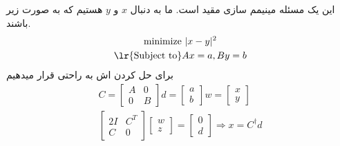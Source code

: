 \documentclass[a4paper]{article}
\begin{document}
\subsection{}
این یک مسئله مینیمم سازی مقید است. ما به دنبال $ x $ و $ y $ هستیم که به صورت زیر باشند. 
\begin{gather*}
	\text{minimize } |x-y|^2 \\
	\text{\lr{Subject to}} Ax = a, By = b\\
\end{gather*}
برای حل کردن اش به راحتی قرار میدهیم 
\begin{gather*}
	C = \begin{bmatrix}
		A & 0 \\
		0 & B
	\end{bmatrix}
	d = \begin{bmatrix}
		a \\
		b
	\end{bmatrix}
	w = \begin{bmatrix}
		x \\
		y
	\end{bmatrix}
	\\
	 \begin{bmatrix}
		2I & C^{T} \\
		C & 0
	\end{bmatrix}
	\begin{bmatrix}
		w \\
		z
	\end{bmatrix}
	= 
	\begin{bmatrix}
		0 \\
		d
	\end{bmatrix}
	\Rightarrow x = C^{\dagger}d
\end{gather*}

\newpage  
\end{document}
